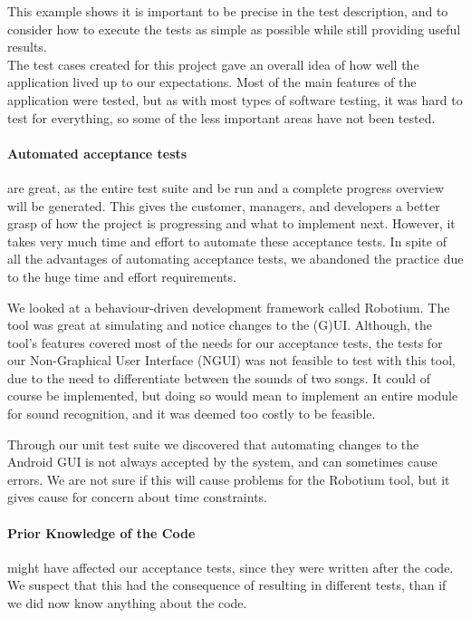This example shows it is important to be precise in the test description, and to consider how to execute the tests as simple as possible while still providing useful results.\\

The test cases created for this project gave an overall idea of how well the application lived up to our expectations.
Most of the main features of the application were tested, but as with most types of software testing, it was hard to test for everything, so some of the less important areas have not been tested.

\paragraph{Automated acceptance tests} are great, as the entire test suite and be run and a complete progress overview will be generated.
This gives the customer, managers, and developers a better grasp of how the project is progressing and what to implement next.
However, it takes very much time and effort to automate these acceptance tests.
In spite of all the advantages of automating acceptance tests, we abandoned the practice due to the huge time and effort requirements.

We looked at a behaviour-driven development framework called Robotium.
The tool was great at simulating and notice changes to the (G)UI.
Although, the tool's features covered most of the needs for our acceptance tests, the tests for our Non-Graphical User Interface (NGUI) was not feasible to test with this tool, due to the need to differentiate between the sounds of two songs.
It could of course be implemented, but doing so would mean to implement an entire module for sound recognition, and it was deemed too costly to be feasible. 

Through our unit test suite we discovered that automating changes to the Android GUI is not always accepted by the system, and can sometimes cause errors.
We are not sure if this will cause problems for the Robotium tool, but it gives cause for concern about time constraints.

\paragraph{Prior Knowledge of the Code} might have affected our acceptance tests, since they were written after the code. We suspect that this had the consequence of resulting in different tests, than if we did now know anything about the code. 

